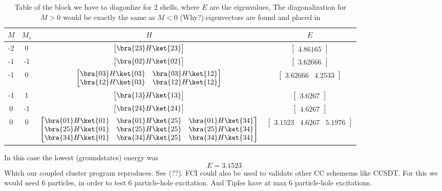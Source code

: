 \begin{table}[H]
\centering
\begin{tabular}{cccc}
\toprule
$M$ & $M_s$ & $H$ & $E$\\
\midrule
-2  & 0    &  $\begin{bmatrix}\bra{2 3}H\ket{2 3}\end{bmatrix}$   &  $\begin{bmatrix}4.86165\end{bmatrix}$ \\
-1  & -1   &  $\begin{bmatrix}\bra{0 2}H\ket{0 2}\end{bmatrix}$   &  $\begin{bmatrix}3.62666\end{bmatrix}$ \\
-1  & 0    &  $\begin{bmatrix}\bra{0 3}H\ket{0 3} & \bra{0 3}H\ket{1 2}\\\bra{1 2}H\ket{0 3} & \bra{1 2}H\ket{1 2}\end{bmatrix}$   &  $\begin{bmatrix}3.62666 & 4.2533\end{bmatrix}$  \\
-1  & 1    &  $\begin{bmatrix}\bra{1 3}H\ket{1 3}\end{bmatrix}$   &  $\begin{bmatrix}3.6267\end{bmatrix}$ \\
 0  & -1   &  $\begin{bmatrix}\bra{2 4}H\ket{2 4}\end{bmatrix}$   &  $\begin{bmatrix}4.6267\end{bmatrix}$  \\
 0  & 0    &  $\begin{bmatrix}\bra{0 1}H\ket{0 1} & \bra{0 1}H\ket{2 5} & \bra{0 1}H\ket{3 4}\\ \bra{2 5}H\ket{0 1} & \bra{2 5}H\ket{2 5} & \bra{2 5}H\ket{3 4}\\ \bra{3 4}H\ket{0 1} & \bra{3 4}H\ket{2 5} & \bra{3 4}H\ket{3 4}\end{bmatrix}$ &  $\begin{bmatrix}3.1523 & 4.6267 & 5.1976 \end{bmatrix}$ \\
\bottomrule
\end{tabular}
\caption{Table of the block we have to diagonlize for 2 shells, where $E$ are the eigenvalues, The diagonalization for $M>0$ would be exactly the same as $M<0$ (Why?).eigenvectors are found and placed in}
\end{table}
%
In this case the lowest (groundstates) energy was
\begin{equation}
E = 3.1523
  \label{groundstates}
\end{equation}
%
Which our coupled cluster program reproduces. See (??). FCI could also be used to validate other CC schemems like CCSDT. For this we would need 6 particles, in order to test 6 particle-hole excitation. And Tiples have at max 6 particle-hole excitations. 

